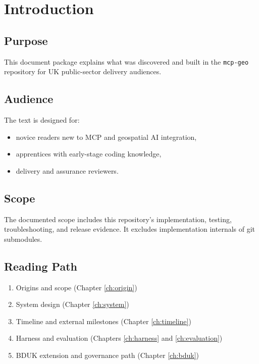 \chapter{Introduction}
\label{ch:introduction}

\section{Purpose}

This document package explains what was discovered and built in the \texttt{mcp-geo}
repository for UK public-sector delivery audiences.

\section{Audience}

The text is designed for:
\begin{itemize}
  \item novice readers new to MCP and geospatial AI integration,
  \item apprentices with early-stage coding knowledge,
  \item delivery and assurance reviewers.
\end{itemize}

\section{Scope}

The documented scope includes this repository's implementation, testing,
troubleshooting, and release evidence. It excludes implementation internals of
git submodules.

\section{Reading Path}

\begin{enumerate}
  \item Origins and scope (Chapter \ref{ch:origin})
  \item System design (Chapter \ref{ch:system})
  \item Timeline and external milestones (Chapter \ref{ch:timeline})
  \item Harness and evaluation (Chapters \ref{ch:harness} and \ref{ch:evaluation})
  \item BDUK extension and governance path (Chapter \ref{ch:bduk})
\end{enumerate}
